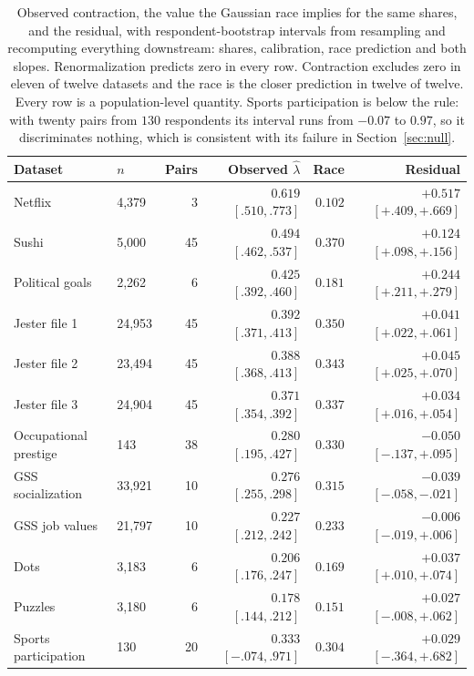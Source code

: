 \documentclass[11pt]{article}
\begin{document}
\begin{table}[ht]
\centering
\small
\begin{tabular}{llrrrr}
\toprule
Dataset & $n$ & Pairs & Observed $\hat\lambda$ & Race & Residual \\
\midrule
Netflix & 4{,}379 & 3 & $0.619$ $[.510,.773]$ & $0.102$ & $+0.517$ $[+.409,+.669]$ \\
Sushi & 5{,}000 & 45 & $0.494$ $[.462,.537]$ & $0.370$ & $+0.124$ $[+.098,+.156]$ \\
Political goals & 2{,}262 & 6 & $0.425$ $[.392,.460]$ & $0.181$ & $+0.244$ $[+.211,+.279]$ \\
Jester file 1 & 24{,}953 & 45 & $0.392$ $[.371,.413]$ & $0.350$ & $+0.041$ $[+.022,+.061]$ \\
Jester file 2 & 23{,}494 & 45 & $0.388$ $[.368,.413]$ & $0.343$ & $+0.045$ $[+.025,+.070]$ \\
Jester file 3 & 24{,}904 & 45 & $0.371$ $[.354,.392]$ & $0.337$ & $+0.034$ $[+.016,+.054]$ \\
Occupational prestige & 143 & 38 & $0.280$ $[.195,.427]$ & $0.330$ & $-0.050$ $[-.137,+.095]$ \\
GSS socialization & 33{,}921 & 10 & $0.276$ $[.255,.298]$ & $0.315$ & $-0.039$ $[-.058,-.021]$ \\
GSS job values & 21{,}797 & 10 & $0.227$ $[.212,.242]$ & $0.233$ & $-0.006$ $[-.019,+.006]$ \\
Dots & 3{,}183 & 6 & $0.206$ $[.176,.247]$ & $0.169$ & $+0.037$ $[+.010,+.074]$ \\
Puzzles & 3{,}180 & 6 & $0.178$ $[.144,.212]$ & $0.151$ & $+0.027$ $[-.008,+.062]$ \\
\midrule
Sports participation & 130 & 20 & $0.333$ $[-.074,.971]$ & $0.304$ & $+0.029$ $[-.364,+.682]$ \\
\bottomrule
\end{tabular}
\caption{Observed contraction, the value the Gaussian race implies for the same
shares, and the residual, with respondent-bootstrap intervals from resampling and
recomputing everything downstream: shares, calibration, race prediction and both
slopes. Renormalization predicts zero in every row. Contraction excludes zero in
eleven of twelve datasets and the race is the closer prediction in twelve of twelve.
Every row is a population-level quantity. Sports participation is below the rule: with
twenty pairs from $130$ respondents its interval runs from $-0.07$ to $0.97$, so it
discriminates nothing, which is consistent with its failure in
Section~\ref{sec:null}.}
\label{tab:scorecard}
\end{table}
\end{document}
